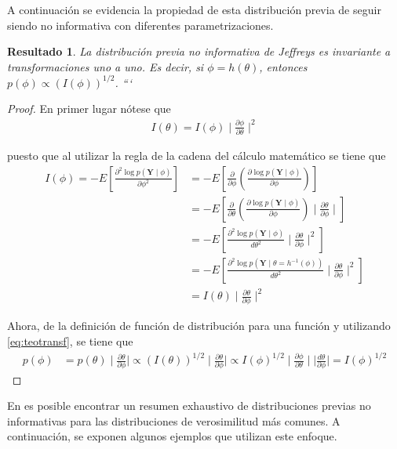 \documentclass[
  spanish,
]{book}
\newtheorem{proposition}{Resultado}[chapter]
\theoremstyle{definition}
\theoremstyle{definition}
\theoremstyle{definition}
\theoremstyle{remark}
\begin{document}
A continuación se evidencia la propiedad de esta distribución previa de
seguir siendo no informativa con diferentes parametrizaciones.

\begin{proposition}
\protect\hypertarget{prp:unnamed-chunk-17}{}{\label{prp:unnamed-chunk-17} }La distribución previa no informativa de Jeffreys es invariante a transformaciones uno a uno. Es decir, si \(\phi=h(\theta)\), entonces \(p(\phi)\propto(I(\phi))^{1/2}\).
```
\end{proposition}
\begin{proof}
\iffalse{} {Prueba. } \fi{}En primer lugar nótese que
\begin{align*}
I(\theta)=I(\phi) \mid \frac{\partial\phi}{\partial\theta} \mid ^{2}
\end{align*}

puesto que al utilizar la regla de la cadena del cálculo matemático se tiene que
\begin{align*}
I(\phi)= - E\left[\frac{\partial^2 \log p(\mathbf{Y} \mid \phi)}{\partial\phi^2}\right]
&= - E\left[\frac{\partial}{\partial\phi}\left(\frac{\partial \log p(\mathbf{Y} \mid \phi)}{\partial\phi}\right)\right]\\
&= - E\left[\frac{\partial}{\partial\theta}\left(\frac{\partial \log p(\mathbf{Y} \mid \phi)}{\partial\phi}\right) \mid \frac{\partial\theta}{\partial\phi} \mid \right]\\
&= - E\left[\frac{\partial^2 \log p(\mathbf{Y} \mid \phi)}{d\theta^2} \mid \frac{\partial\theta}{\partial\phi} \mid ^{2}\right]\\
&= - E\left[\frac{\partial^2 \log p(\mathbf{Y} \mid \theta =h^{-1}(\phi))}{d\theta^2} \mid \frac{\partial\theta}{\partial\phi} \mid ^{2}\right]\\
&= I(\theta) \mid \frac{\partial\theta}{\partial\phi} \mid ^{2}
\end{align*}

Ahora, de la definición de función de distribución para una función y utilizando \eqref{eq:teotransf}, se tiene que
\begin{align*}
p(\phi)&=p(\theta) \mid \frac{\partial\theta}{\partial\phi} \mid
\propto (I(\theta))^{1/2} \mid \frac{\partial\theta}{\partial\phi} \mid
\propto I(\phi)^{1/2} \mid \frac{\partial\phi}{\partial\theta} \mid  \mid \frac{d\theta}{\partial\phi} \mid =I(\phi)^{1/2}
\end{align*}
\end{proof}

En \citet[p.~59]{BoxTiao} es posible encontrar un resumen exhaustivo de distribuciones previas no informativas para las distribuciones de verosimilitud más comunes. A continuación, se exponen
algunos ejemplos que utilizan este enfoque.
\end{document}
